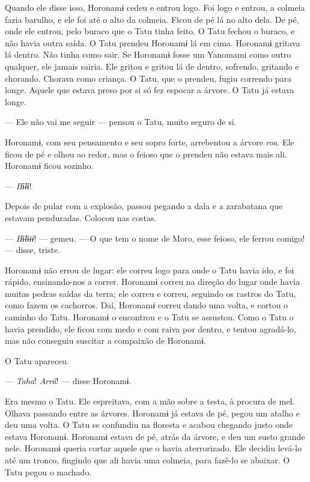 Quando ele disse isso, Horonamɨ cedeu e entrou logo. Foi logo e entrou,
a colmeia fazia barulho, e ele foi até o alto da colmeia. Ficou de pé lá
no alto dela. De pé, onde ele entrou, pelo buraco que o Tatu tinha feito.
O Tatu fechou o buraco, e não havia outra saída. O Tatu prendeu Horonamɨ
lá em cima. Horonamɨ gritava lá dentro. Não tinha como sair. Se Horonamɨ
fosse um Yanomami como outro qualquer, ele jamais sairia. Ele gritou e
gritou lá de dentro, sofrendo, gritando e chorando. Chorava como
criança. O Tatu, que o prendeu, fugiu correndo para longe. Aquele que
estava preso por si só fez espocar a árvore. O Tatu já estava longe. 

--- Ele não vai me seguir --- pensou o Tatu, muito seguro de si. 

Horonamɨ, com seu pensamento e seu sopro forte, arrebentou a
árvore \textit{roa}. Ele ficou de pé e olhou ao redor, mas o feioso que o
prendeu não estava mais ali. Horonamɨ ficou sozinho. 

--- \textit{Hɨ̃ɨɨ}! 

Depois de pular com a explosão, passou pegando a dala e a zarabatana que
estavam penduradas. Colocou nas costas. 

--- \textit{Hɨ̃ɨɨɨɨ}! --- gemeu. --- O que tem o nome de Moro, esse feioso,
ele ferrou comigo! --- disse, triste.

Horonamɨ não errou de lugar: ele correu logo para onde o Tatu havia ido,
e foi rápido, ensinando-nos a correr. Horonamɨ correu na direção do
lugar onde havia muitas pedras saídas da terra; ele correu e correu,
seguindo os rastros do Tatu, como fazem os cachorros. Daí, Horonamɨ
correu dando uma volta, e cortou o caminho do Tatu. Horonamɨ o
encontrou e o Tatu se assustou. Como o Tatu o havia prendido, ele ficou
com medo e com raiva por dentro, e tentou agradá-lo, mas não conseguiu
suscitar a compaixão de Horonamɨ. 

O Tatu apareceu.

--- \textit{Taha}! \textit{Arrá}! --- disse Horonamɨ. 

Era mesmo o Tatu. Ele espreitava, com a mão sobre a testa, à procura de
mel. Olhava passando entre as árvores. Horonamɨ já estava de pé, pegou
um atalho e deu uma volta. O Tatu se confundiu na floresta e acabou
chegando justo onde estava Horonamɨ. Horonamɨ estava de pé, atrás da
árvore, e deu um susto grande nele. Horonamɨ queria cortar aquele que o
havia aterrorizado. Ele decidiu levá-lo até um tronco, fingindo que ali
havia uma colmeia, para fazê-lo se abaixar. O Tatu pegou o machado. 

